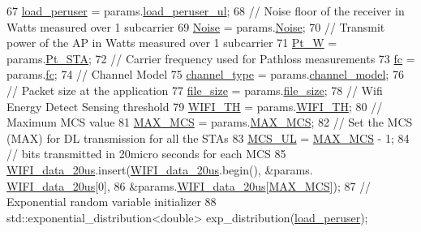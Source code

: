 \begin{DoxyCode}
67     \hyperlink{classSTA_ab95904d5e62ea7cfe15488e8a2d7b56e}{load\_peruser} = params.\hyperlink{structparameters_a56a8c884f07a495d1705f0c1afb34aac}{load\_peruser\_ul};
68     \textcolor{comment}{// Noise floor of the receiver in Watts measured over 1 subcarrier}
69     \hyperlink{classSTA_ae9a319d9b58f28610defc9e0fc51aa60}{Noise} = params.\hyperlink{structparameters_a6cf4f2d340c4d03c138cee3460f047eb}{Noise};
70     \textcolor{comment}{// Transmit power of the AP in Watts measured over 1 subcarrier}
71     \hyperlink{classSTA_a8ec6260021c741ccc08a6ec25793c1f3}{Pt\_W} = params.\hyperlink{structparameters_a52242f438292fd65f607c8789631d10d}{Pt\_STA};
72     \textcolor{comment}{// Carrier frequency used for Pathloss measurements}
73     \hyperlink{classSTA_a07c54eac4b0f34790e0a2e4dcbe720ac}{fc} = params.\hyperlink{structparameters_afcbb78167d255c8c249b6e868ae34cb8}{fc};
74     \textcolor{comment}{// Channel Model}
75     \hyperlink{classSTA_a5d1a873bdd6733103441abadf4db1475}{channel\_type} = params.\hyperlink{structparameters_a16dba3ff81522c5acf14750929b461fc}{channel\_model};
76     \textcolor{comment}{// Packet size at the application }
77     \hyperlink{classSTA_acdf811c6a31773fa3d64ef07efa8941d}{file\_size} = params.\hyperlink{structparameters_a839992f2d6e75df2b71fa74147cd89fd}{file\_size};
78     \textcolor{comment}{// Wifi Energy Detect Sensing threshold}
79     \hyperlink{classSTA_a4cf7f03951b6bf6263b55c5ff4f28f4c}{WIFI\_TH} = params.\hyperlink{structparameters_a7f13646d17a6dd826f944a905a96cbd7}{WIFI\_TH};
80     \textcolor{comment}{// Maximum MCS value}
81     \hyperlink{classSTA_a5c5df3db89aa13fc409c4c0d6f8924d2}{MAX\_MCS} = params.\hyperlink{structparameters_ab2821a9be5274d77b2f4f76ff06b2e65}{MAX\_MCS};
82     \textcolor{comment}{// Set the MCS (MAX) for DL transmission for all the STAs}
83     \hyperlink{classSTA_a21e0611dde6754144f220cc7312d5909}{MCS\_UL} = \hyperlink{classSTA_a5c5df3db89aa13fc409c4c0d6f8924d2}{MAX\_MCS} - 1;
84     \textcolor{comment}{// bits transmitted in 20micro seconds for each MCS}
85     \hyperlink{classSTA_a97c786822c28334e2a1d351ae5fe9d52}{WIFI\_data\_20us}.insert(\hyperlink{classSTA_a97c786822c28334e2a1d351ae5fe9d52}{WIFI\_data\_20us}.begin(), &params.
      \hyperlink{structparameters_a43e6f6e73d1ad0d57f816679cbbfd5a8}{WIFI\_data\_20us}[0],
86             &params.\hyperlink{structparameters_a43e6f6e73d1ad0d57f816679cbbfd5a8}{WIFI\_data\_20us}[\hyperlink{classSTA_a5c5df3db89aa13fc409c4c0d6f8924d2}{MAX\_MCS}]);
87     \textcolor{comment}{// Exponential random variable initializer}
88     std::exponential\_distribution<double> exp\_distribution(\hyperlink{classSTA_ab95904d5e62ea7cfe15488e8a2d7b56e}{load\_peruser});

\end{DoxyCode}
